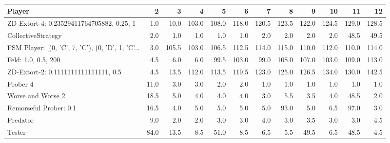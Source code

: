 \begin{tabular}{lrrrrrrrrrrr}
\toprule
                                            Player &     2 &      3 &      4 &      5 &      6 &      7 &      8 &      9 &     10 &     11 &     12 \\
\midrule
         ZD-Extort-4: 0.23529411764705882, 0.25, 1 &   1.0 &   10.0 &  103.0 &  108.0 &  118.0 &  120.5 &  123.5 &  122.0 &  124.5 &  129.0 &  128.5 \\
                                CollectiveStrategy &   2.0 &    1.0 &    1.0 &    1.0 &    1.0 &    2.0 &    2.0 &    2.0 &    2.0 &   48.5 &   49.5 \\
 FSM Player: [(0, 'C', 7, 'C'), (0, 'D', 1, 'C'... &   3.0 &  105.5 &  103.0 &  106.5 &  112.5 &  114.0 &  115.0 &  110.0 &  112.0 &  110.0 &  114.0 \\
                               Feld: 1.0, 0.5, 200 &   4.5 &    6.0 &    6.0 &   99.5 &  103.0 &   99.0 &  108.0 &  107.0 &  103.0 &  109.0 &  113.0 \\
              ZD-Extort-2: 0.1111111111111111, 0.5 &   4.5 &   13.5 &  112.0 &  113.5 &  119.5 &  123.0 &  125.0 &  126.5 &  134.0 &  130.0 &  142.5 \\
                                          Prober 4 &  11.0 &    3.0 &    3.0 &    2.0 &    2.0 &    1.0 &    1.0 &    1.0 &    1.0 &    1.0 &    1.0 \\
                                 Worse and Worse 2 &  18.5 &    5.0 &    4.0 &    4.0 &    4.0 &    3.0 &    5.5 &    3.5 &    4.0 &   48.5 &    2.0 \\
                            Remorseful Prober: 0.1 &  16.5 &    4.0 &    5.0 &    5.0 &    5.0 &    5.0 &   93.0 &    5.0 &    6.5 &   97.0 &    3.0 \\
                                          Predator &   9.0 &    2.0 &    2.0 &    3.0 &    3.0 &    4.0 &    3.0 &    3.5 &    3.0 &    3.0 &    4.5 \\
                                            Tester &  84.0 &   13.5 &    8.5 &   51.0 &    8.5 &    6.5 &    5.5 &   49.5 &    6.5 &   48.5 &    4.5 \\
\bottomrule
\end{tabular}
